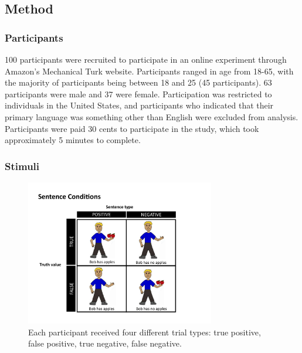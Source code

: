 \documentclass[10pt,letterpaper]{article}
\begin{document}
\subsection{Method}

\subsubsection{Participants}
100 participants were recruited to participate in an online experiment through Amazon's Mechanical Turk website.  Participants ranged in age from 18-65, with the majority of participants being between 18 and 25 (45 participants).  63 participants were male and 37 were female.  Participation was restricted to individuals in the United States, and participants who indicated that their primary language was something other than English were excluded from analysis.  Participants were paid 30 cents to participate in the study, which took approximately 5 minutes to complete.  

\subsubsection{Stimuli}
\begin{figure}[t]
\begin{center} 
\includegraphics[width=3.25in]{figures/negatron_trialfig.pdf}
\caption{\label{fig:addition_subs} Each participant received four different trial types: true positive, false positive, true negative, false negative. }
\end{center} 
\end{figure}
\end{document}
